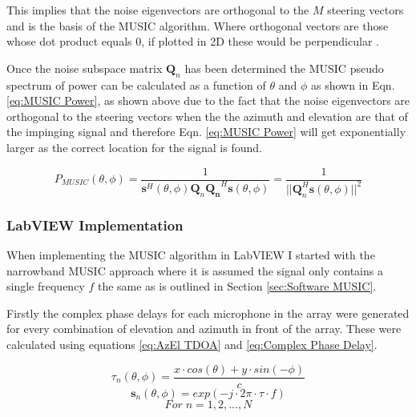 \documentclass{UoNMCHA}
\numberwithin{equation}{section}
\begin{document}
    This implies that the noise eigenvectors are orthogonal to the $M$ steering vectors and is the basis of the MUSIC algorithm. Where orthogonal vectors are those whose dot product equals $0$, if plotted in 2D these would be perpendicular \citep{Wei}.
    
    Once the noise subspace matrix $\mathbf{Q}_n$ has been determined the MUSIC pseudo spectrum of power can be calculated as a function of $\theta$ and $\phi$ as shown in Eqn. \ref{eq:MUSIC Power}, as shown above due to the fact that the noise eigenvectors are orthogonal to the steering vectors when the the azimuth and elevation are that of the impinging signal and therefore Eqn. \ref{eq:MUSIC Power} will get exponentially larger as the correct location for the signal is found.
    
    \begin{equation}
        P_{MUSIC}(\theta,\phi) = \frac{1}{\mathbf{s}^H(\theta,\phi)\mathbf{Q}_n\mathbf{Q_n}^H\mathbf{s}(\theta,\phi)} = \frac{1}{||\mathbf{Q}_n^H\mathbf{s}(\theta,\phi)||^2}
        \label{eq:MUSIC Power}
    \end{equation}

\subsubsection{LabVIEW Implementation} \label{sec:MUSIC LabVIEW}
    When implementing the MUSIC algorithm in LabVIEW I started with the narrowband MUSIC approach where it is assumed the signal only contains a single frequency $f$ the same as is outlined in Section \ref{sec:Software MUSIC}.
    
    Firstly the complex phase delays for each microphone in the array were generated for every combination of elevation and azimuth in front of the array. These were calculated using equations \ref{eq:AzEl TDOA} and \ref{eq:Complex Phase Delay}.
    
    \begin{equation}
        \tau_n(\theta, \phi) = \frac{x \cdot cos(\theta) + y \cdot sin(-\phi)}{c}
        \label{eq:AzEl TDOA}
    \end{equation}
    \begin{equation}
        \mathbf{s}_n(\theta,\phi) = exp(-j \cdot 2\pi \cdot \tau \cdot f)
        \label{eq:Complex Phase Delay}
    \end{equation}
    \begin{equation*}
        For \; n = 1,2,...,N
    \end{equation*}
    
\end{document}
